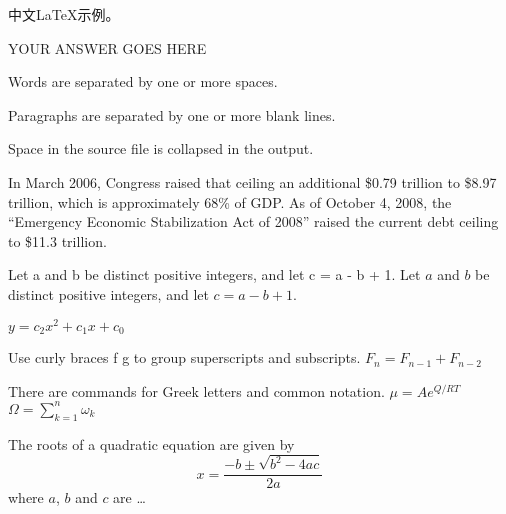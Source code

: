 \documentclass{article}
\begin{document}
中文\LaTeX 示例。

\item
YOUR ANSWER GOES HERE

\item 
Words are separated by one or more
spaces.

Paragraphs are separated by one
or more blank lines.

Space in the source file is        collapsed in the output.

\item 

In March 2006, Congress raised that ceiling an 
additional \$0.79 trillion to \$8.97 trillion,
which is approximately 68\% of GDP. As of October
4, 2008, the ``Emergency Economic Stabilization
Act of 2008'' raised the current debt ceiling
to \$11.3 trillion.

\item 
Let a and b be distinct positive
integers, and let c = a - b + 1.
Let $a$ and $b$ be distinct positive
integers, and let $c = a - b + 1$.

\item 

$ y = c_2 x^2 + c_1 x + c_0 $

Use curly braces f g to group superscripts and subscripts.
$F_n = F_{n-1} + F_{n-2}$ %


There are commands for Greek letters and common notation.
$\mu = A e^{Q/RT}$
$\Omega = \sum_{k=1}^{n} \omega_k$


The roots of a quadratic equation
are given by
\begin{equation}
x = \frac{-b \pm \sqrt{b^2 - 4ac}}
{2a}
\end{equation}
where $a$, $b$ and $c$ are \ldots
\end{document}
